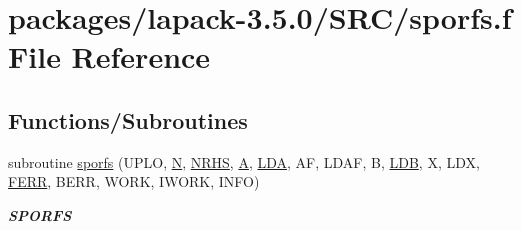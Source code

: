 \hypertarget{sporfs_8f}{}\section{packages/lapack-\/3.5.0/\+S\+R\+C/sporfs.f File Reference}
\label{sporfs_8f}
\subsection*{Functions/\+Subroutines}
\begin{DoxyCompactItemize}
\item 
subroutine \hyperlink{group__realPOcomputational_gae4835582211ebddde1f5882c67561d97}{sporfs} (U\+P\+L\+O, \hyperlink{polmisc_8c_a0240ac851181b84ac374872dc5434ee4}{N}, \hyperlink{example__user_8c_aa0138da002ce2a90360df2f521eb3198}{N\+R\+H\+S}, \hyperlink{classA}{A}, \hyperlink{example__user_8c_ae946da542ce0db94dced19b2ecefd1aa}{L\+D\+A}, A\+F, L\+D\+A\+F, B, \hyperlink{example__user_8c_a50e90a7104df172b5a89a06c47fcca04}{L\+D\+B}, X, L\+D\+X, \hyperlink{superlu__enum__consts_8h_af00a42ecad444bbda75cde1b64bd7e72a78fd14d7abebae04095cfbe02928f153}{F\+E\+R\+R}, B\+E\+R\+R, W\+O\+R\+K, I\+W\+O\+R\+K, I\+N\+F\+O)
\begin{DoxyCompactList}\small\item\em {\bfseries S\+P\+O\+R\+F\+S} \end{DoxyCompactList}\end{DoxyCompactItemize}
